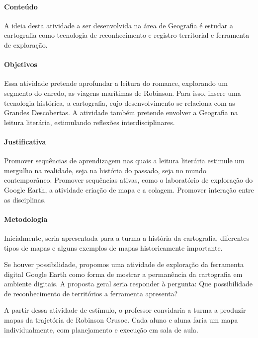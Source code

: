 \documentclass{article}
\begin{document}

\paragraph{Conteúdo}
A ideia desta atividade a ser desenvolvida na área de Geografia é
estudar a cartografia como tecnologia de reconhecimento e registro
territorial e ferramenta de exploração.

\paragraph{Objetivos}

Essa atividade pretende aprofundar a leitura do romance, explorando um
segmento do enredo, as viagens marítimas de Robinson. Para isso, insere
uma tecnologia histórica, a cartografia, cujo desenvolvimento se
relaciona com as Grandes Descobertas. A atividade também pretende
envolver a Geografia na leitura literária, estimulando reflexões
interdisciplinares.

\paragraph{Justificativa}
Promover sequências de aprendizagem nas quais a leitura literária
estimule um mergulho na realidade, seja na história do passado, seja no
mundo contemporâneo. Promover sequências ativas, como o laboratório de
exploração do Google Earth, a atividade criação de mapa e a colagem.
Promover interação entre as disciplinas.

\paragraph{Metodologia}
Inicialmente, seria apresentada para a turma a história da cartografia,
diferentes tipos de mapas e alguns exemplos de mapas historicamente
importante.

Se houver possibilidade, propomos uma atividade de exploração da
ferramenta digital Google Earth como forma de mostrar a permanência da
cartografia em ambiente digitais. A proposta geral seria responder à
pergunta: Que possibilidade de reconhecimento de territórios a
ferramenta apresenta?

A partir dessa atividade de estímulo, o professor convidaria a turma a
produzir mapas da trajetória de Robinson Crusoe. Cada aluno e aluna
faria um mapa individualmente, com planejamento e execução em sala de
aula.
\end{document}
